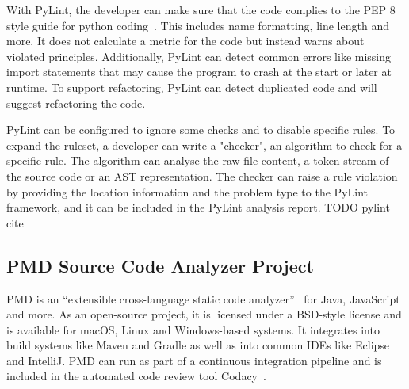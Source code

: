 With PyLint, the developer can make sure that the code complies to the PEP 8 style guide for python coding~\cite{pep8}. This includes name formatting, line length and more. It does not calculate a metric for the code but instead warns about violated principles. Additionally, PyLint can detect common errors like missing import statements that may cause the program to crash at the start or later at runtime. To support refactoring, PyLint can detect duplicated code and will suggest refactoring the code.

PyLint can be configured to ignore some checks and to disable specific rules. To expand the ruleset, a developer can write a "checker", an algorithm to check for a specific rule. The algorithm can analyse the raw file content, a token stream of the source code or an AST representation. The checker can raise a rule violation by providing the location information and the problem type to the PyLint framework, and it can be included in the PyLint analysis report. TODO pylint cite

\subsection{PMD Source Code Analyzer Project}
PMD is an \enquote{extensible cross-language static code analyzer}~\cite{noauthor_pmd_nodate} for Java, JavaScript and more. As an open-source project, it is licensed under a BSD-style license and is available for macOS, Linux and Windows-based systems. It integrates into build systems like Maven and Gradle as well as into common IDEs like Eclipse and IntelliJ. PMD can run as part of a continuous integration pipeline and is included in the automated code review tool Codacy~\cite{noauthor_codacy_nodate-1}.

